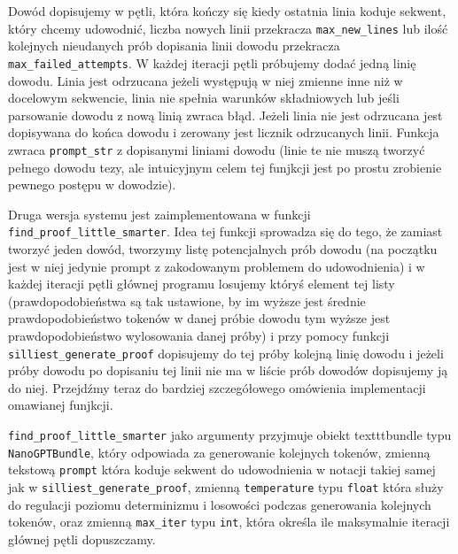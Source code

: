 \documentclass{article}
\begin{document}
Dowód dopisujemy w pętli, która kończy się kiedy ostatnia linia koduje sekwent, który chcemy udowodnić, liczba nowych linii przekracza \texttt{max\_new\_lines} lub ilość kolejnych nieudanych prób dopisania 
linii dowodu przekracza \texttt{max\_failed\_attempts}. W każdej iteracji pętli próbujemy dodać jedną linię dowodu. Linia jest odrzucana jeżeli występują w niej zmienne inne niż w docelowym sekwencie, linia nie spełnia
warunków składniowych  lub jeśli 
parsowanie dowodu z nową linią zwraca błąd. Jeżeli linia nie jest odrzucana jest dopisywana do końca dowodu i zerowany jest licznik odrzucanych linii. Funkcja zwraca \texttt{prompt\_str} z dopisanymi liniami dowodu
(linie te nie muszą tworzyć pełnego dowodu tezy, ale intuicyjnym celem tej funjkcji jest po prostu zrobienie pewnego postępu w dowodzie).

Druga wersja systemu jest zaimplementowana w funkcji \texttt{find\_proof\_little\_smarter}. Idea tej funkcji sprowadza się do tego, że zamiast tworzyć jeden dowód, tworzymy listę potencjalnych prób dowodu 
(na początku jest w niej jedynie prompt z zakodowanym problemem do udowodnienia) i w każdej iteracji pętli głównej programu losujemy któryś element tej listy (prawdopodobieństwa są tak ustawione, by 
im wyższe jest średnie prawdopodobieństwo tokenów w danej próbie dowodu tym wyższe jest prawdopodobieństwo wylosowania danej próby) i przy pomocy funkcji \texttt{silliest\_generate\_proof} dopisujemy do tej próby
kolejną linię dowodu i jeżeli próby dowodu po dopisaniu tej linii nie ma w liście prób dowodów dopisujemy ją do niej. Przejdźmy teraz do bardziej szczegółowego omówienia implementacji omawianej funjkcji.

\texttt{find\_proof\_little\_smarter} jako argumenty przyjmuje obiekt texttt{bundle} typu \texttt{NanoGPTBundle}, który odpowiada za generowanie kolejnych tokenów, zmienną tekstową \texttt{prompt} która koduje sekwent do udowodnienia w 
notacji takiej samej jak w \texttt{silliest\_generate\_proof}, zmienną \texttt{temperature} typu \texttt{float} która służy do regulacji poziomu determinizmu i losowości podczas generowania kolejnych tokenów, oraz
zmienną \texttt{max\_iter} typu \texttt{int}, która określa ile maksymalnie iteracji głównej pętli dopuszczamy.
\end{document}
